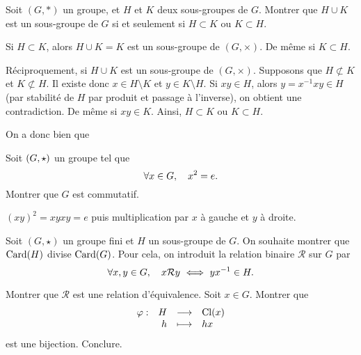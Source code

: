 \documentclass{magnolia}
\begin{document}
Soit $(G,*)$ un groupe, et $H$ et $K$ deux sous-groupes de $G$. Montrer que
$H\cup K$ est un sous-groupe de $G$ si et seulement si  $H\subset K$ ou
$K\subset  H$.

\begin{sol}
Si $H\subset K$, alors $H\cup K = K$ est un sous-groupe de  $(G,\times)$. De même si $K\subset H$.
    
        Réciproquement, si $H\cup K$ est un sous-groupe de  $(G,\times)$. Supposons que $H\not\subset K$ et $K\not\subset H$. 
        Il existe donc $x \in H\setminus K$ et $y \in K\setminus H$. 
        Si $xy \in H$, alors $y = x^{-1}xy \in H$ (par stabilité de $H$ par produit et passage à l'inverse), on obtient une contradiction. De même si $xy \in K$.
        Ainsi, $H\subset K$ ou $K\subset H$.
        
        On a donc bien que 
        \begin{center}
        \end{center}
\end{sol}

Soit $\left(G,\star\right)$ un groupe tel que
\[\forall x\in G ,\quad x^2=e.\]
Montrer que $G$ est commutatif.

\begin{sol}
$(xy)^2=xyxy=e$ puis multiplication par $x$ à gauche et $y$ à droite.
\end{sol}

Soit $(G,\star)$ un groupe fini et $H$ un sous-groupe de $G$. On souhaite montrer
que $\operatorname{Card}(H)$ divise $\operatorname{Card}(G)$. Pour cela, on introduit la relation binaire $\mathcal{R}$
sur $G$ par
\[\forall x,y \in G\qsep x\mathcal{R}y \ \ssi\  yx^{-1}\in H.\]
\begin{questions}
\question Montrer que $\mathcal{R}$ est une relation d'équivalence.
\question Soit $x\in G$. Montrer que
  \[\begin{array}[t]{lrcl} \displaystyle{\varphi} : & \displaystyle{H} & \longrightarrow & \displaystyle{{\rm Cl}(x)} \\ & \displaystyle{h} & \longmapsto & \displaystyle{hx} \end{array}\]
  est une bijection.
\question Conclure.
\end{questions}



\end{document}
